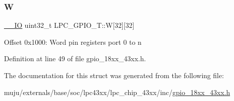 \subsubsection{\texorpdfstring{W}{W}}
{\footnotesize\ttfamily \hyperlink{core__sc300_8h_aec43007d9998a0a0e01faede4133d6be}{\+\_\+\+\_\+\+IO} uint32\+\_\+t L\+P\+C\+\_\+\+G\+P\+I\+O\+\_\+\+T\+::W\mbox{[}32\mbox{]}\mbox{[}32\mbox{]}}

Offset 0x1000\+: Word pin registers port 0 to n 

Definition at line 49 of file gpio\+\_\+18xx\+\_\+43xx.\+h.



The documentation for this struct was generated from the following file\+:\begin{DoxyCompactItemize}
\item 
muju/externals/base/soc/lpc43xx/lpc\+\_\+chip\+\_\+43xx/inc/\hyperlink{gpio__18xx__43xx_8h}{gpio\+\_\+18xx\+\_\+43xx.\+h}\end{DoxyCompactItemize}
